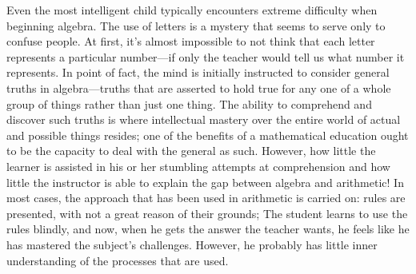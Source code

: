 \documentclass[a4paper,12pt]{book}[2004/02/16]
\theoremstyle{ilemma}
\theoremstyle{itheorem}
\theoremstyle{iother}
\theoremstyle{icorollary}
\theoremstyle{numcorollary}
\theoremstyle{idefinition}
\begin{document}
Even the most intelligent child typically encounters extreme difficulty when beginning algebra. The use of letters is a mystery that seems to serve only to confuse people. At first, it's almost impossible to not think that each letter represents a particular number—if only the teacher would tell us what number it represents. In point of fact, the mind is initially instructed to consider general truths in algebra—truths that are asserted to hold true for any one of a whole group of things rather than just one thing. The ability to comprehend and discover such truths is where intellectual mastery over the entire world of actual and possible things resides; one of the benefits of a mathematical education ought to be the capacity to deal with the general as such. However, how little the learner is assisted in his or her stumbling attempts at comprehension and how little the instructor is able to explain the gap between algebra and arithmetic! In most cases, the approach that has been used in arithmetic is carried on: rules are presented, with not a great reason of
their grounds; The student learns to use the rules blindly, and now, when he gets the answer the teacher wants, he feels like he has mastered the subject's challenges. However, he probably has little inner understanding of the processes that are used.
\end{document}
